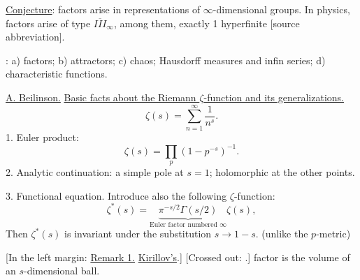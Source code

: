 \underline{Conjecture}: factors arise in representations of $\infty$-dimensional groups.
In physics, factors arise of type $\overline{III}_{\infty}$,
among them, exactly 1 hyperfinite [source abbreviation].

\underline{}:
a) factors;
b) attractors; c) chaos; Hausdorff measures and infin series;
d) characteristic functions.

\underline{A. Beilinson.}
\underline{Basic facts about the Riemann $\zeta$-function and its generalizations.}
\begin{equation*}
\zeta(s)=\sum_{n=1}^{\infty}\frac1{n^s}.
\end{equation*}
1. Euler product:
\begin{equation*}
\zeta(s)=\prod_p(1-p^{-s})^{-1}.
\end{equation*}
2. Analytic continuation: a simple pole at $s=1$; holomorphic at the other points.

3. Functional equation. Introduce also the following $\zeta$-function:
\begin{equation*}
\zeta^*(s)=\underbrace{\pi^{-s/2}\Gamma(s/2)}_{\text{Euler factor numbered }\infty}\zeta(s),
\end{equation*}
Then $\zeta^*(s)$ is invariant under the substitution $s\to1-s$.
(unlike the $p$-metric)

[In the left margin: \underline{Remark 1.} \underline{Kirillov's}.]
[Crossed out: .]
factor is the volume of an $s$-dimensional ball.



